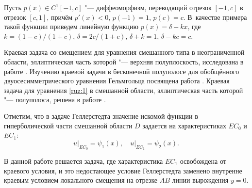 Пусть $p(x) \in {C^1}[ - 1,c]$ "--- диффеоморфизм, переводящий отрезок $[ - 1, c]$ в  отрезок $[c, 1]$, причём $p'(x) < 0$,
$p( - 1) = 1$, $p(c) = c$. 
В~качестве примера такой функции 
приведем линейную функцию $p(x) = \delta  - kx$, где
$k = (1 - c)/(1 + c)$, $\delta  = 2c/(1 + c)$,
$\delta  + k = 1$, $\delta  - kc = c$.

Краевая задача со смещением для уравнения смешанного типа в неограниченной области, эллиптическая часть которой "--- верхняя полуплоскость, исследована в работе \cite{ruz:bib:1}. Изучению краевой задачи в бесконечной полуполосе для обобщённого двуосесимметрического уравнения Гельмгольца посвящена работа \cite{ruz:bib:2}. Краевая задача для уравнения \eqref{ruz:1} в смешанной области, эллиптическая часть которой "--- полуполоса, решена в работе \cite{ruz:bib:3}.

Отметим, что в задаче Геллерстедта \cite{ruz:bib:4} значение искомой функции в гиперболической части смешанной области $D$
задается на характеристиках $E{C_0}$ и $E{C_1}$:
$${u \bigl|_{E{C_0}}} = {\psi _1}(x), \quad { u \bigr|_{E{C_1}}} = {\psi _2}(x).$$

В данной работе решается задача, где характеристика $E{C_1}$ освобождена от краевого условия, и это недостающее условие Геллерстедта заменено внутренне краевым условием локального смещения на отрезке
$AB$ линии вырождения $y = 0$.

\smallskip

\hypertarget{ruz:G}{}

